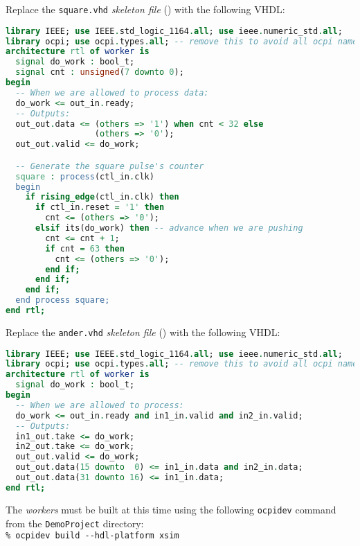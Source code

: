 \bend
\bstart
Replace the \verb+square.vhd+ \textit{skeleton file} () with the following VHDL:
\begin{lstlisting}[language=vhdl, columns=fullflexible, breaklines=true, prebreak=\textbackslash, basicstyle=\ttfamily, showstringspaces=false, upquote=true]
library IEEE; use IEEE.std_logic_1164.all; use ieee.numeric_std.all;
library ocpi; use ocpi.types.all; -- remove this to avoid all ocpi name collisions
architecture rtl of worker is
  signal do_work : bool_t;
  signal cnt : unsigned(7 downto 0);
begin
  -- When we are allowed to process data:
  do_work <= out_in.ready;
  -- Outputs:
  out_out.data <= (others => '1') when cnt < 32 else
                  (others => '0');
  out_out.valid <= do_work;

  -- Generate the square pulse's counter
  square : process(ctl_in.clk)
  begin
    if rising_edge(ctl_in.clk) then
      if ctl_in.reset = '1' then
        cnt <= (others => '0');
      elsif its(do_work) then -- advance when we are pushing
        cnt <= cnt + 1;
        if cnt = 63 then
          cnt <= (others => '0');
        end if;
      end if;
    end if;
  end process square;
end rtl;
\end{lstlisting}
\bend

\bstart
Replace the \verb+ander.vhd+ \textit{skeleton file}  () with the following VHDL:

\begin{lstlisting}[language=vhdl, columns=fullflexible, breaklines=true, prebreak=\textbackslash, basicstyle=\ttfamily, showstringspaces=false, upquote=true]
library IEEE; use IEEE.std_logic_1164.all; use ieee.numeric_std.all;
library ocpi; use ocpi.types.all; -- remove this to avoid all ocpi name collisions
architecture rtl of worker is
  signal do_work : bool_t;
begin
  -- When we are allowed to process:
  do_work <= out_in.ready and in1_in.valid and in2_in.valid;
  -- Outputs:
  in1_out.take <= do_work;
  in2_out.take <= do_work;
  out_out.valid <= do_work;
  out_out.data(15 downto  0) <= in1_in.data and in2_in.data;
  out_out.data(31 downto 16) <= in1_in.data;
end rtl;
\end{lstlisting}
\bend
\label{example:buildworkers}
The \textit{workers} must be built at this time using the following \verb+ocpidev+ command from the \verb+DemoProject+ directory:\\

\forceindent\verb+% ocpidev build --hdl-platform xsim+
\OcpidevBuild


